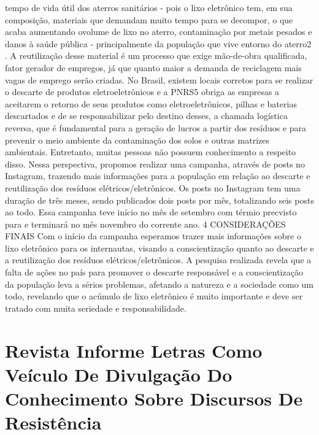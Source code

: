 tempo de vida útil dos aterros sanitários - pois o lixo eletrônico tem, em sua composição, 
materiais que demandam muito tempo para se decompor, o que acaba aumentando ovolume de
lixo no aterro, contaminação por metais pesados e danos à saúde pública - principalmente da 
população que vive entorno do aterro2
. A reutilização desse material é um processo que exige
mão-de-obra qualificada, fator gerador de empregos, já que quanto maior a demanda de 
reciclagem mais vagas de emprego serão criadas.
No Brasil, existem locais corretos para se realizar o descarte de produtos eletroeletrônicos
e a PNRS5
obriga as empresas a aceitarem o retorno de seus produtos como eletroeletrônicos,
pilhas e baterias descartados e de se responsabilizar pelo destino desses, a chamada logística
reversa, que é fundamental para a geração de lucros a partir dos resíduos e para prevenir o meio
ambiente da contaminação dos solos e outras matrizes ambientais. Entretanto, muitas pessoas não
possuem conhecimento a respeito disso.
Nessa perspectiva, propomos realizar uma campanha, através de posts no Instagram,
trazendo mais informações para a população em relação ao descarte e reutilização dos resíduos 
elétricos/eletrônicos. Os posts no Instagram tem uma duração de três meses, sendo publicados 
dois posts por mês, totalizando seis posts ao todo. Essa campanha teve início no mês de setembro
com térmio precvisto para e terminará no mês novembro do corrente ano.
4 CONSIDERAÇÕES FINAIS
Com o início da campanha esperamos trazer mais informações sobre o lixo eletrônico para
os internautas, visando a conscientização quanto ao descarte e a reutilização dos resíduos
elétricos/eletrônicos. A pesquisa realizada revela que a falta de ações no país para promover o
descarte responsável e a conscientização da população leva a sérios problemas, afetando a natureza
e a sociedade como um todo, revelando que o acúmulo de lixo eletrônico é muito importante e
deve ser tratado com muita seriedade e responsabilidade.




\section*{Revista Informe Letras Como Veículo De Divulgação Do Conhecimento Sobre Discursos De Resistência}

